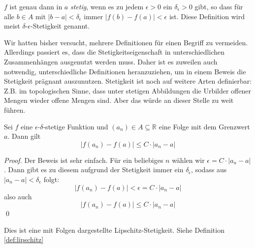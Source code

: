 \begin{definition}
$f$ ist genau dann in $a$ \textsl{stetig}, wenn es zu jedem $\epsilon>0$ ein $\delta_\epsilon > 0$ gibt, so dass für alle $b\in A$ mit $\vert b-a\vert < \delta_\epsilon $ immer $\vert f(b)-f(a)\vert < \epsilon$ ist. Diese Definition wird meist $\delta$-$\epsilon$-Stetigkeit genannt. 
\end{definition}

Wir hatten bisher versucht, mehrere Definitionen für einen Begriff zu vermeiden. Allerdings passiert es, dass die Stetigkeitseigenschaft in unterschiedlichen Zusammenhängen ausgenutzt werden muss. Daher ist es zuweilen auch notwendig, unterschiedliche Definitionen heranzuziehen, um in einem Beweis die Stetigkeit prägnant auszunutzen. Stetigkeit ist noch auf weitere Arten definierbar: Z.B. im topologischen Sinne, dass unter stetigen Abbildungen die Urbilder offener Mengen wieder offene Mengen sind. Aber das würde an dieser Stelle zu weit führen.

\begin{lemma}\label{lem:stetig}
Sei $f$ eine $\epsilon$-$\delta$-stetige Funktion und $(a_n)\in A \subseteq \mathbb{R}$ eine Folge mit dem Grenzwert $a$. Dann gilt
\[
|f(a_n)-f(a)| \le C\cdot |a_n -a|
\]
\end{lemma}
\begin{proof}
Der Beweis ist sehr einfach. Für ein beliebiges $n$ wählen wir $\epsilon = C\cdot |a_n -a|$. Dann gibt es zu diesem aufgrund der Stetigkeit immer ein $\delta_\epsilon$, sodass aus $|a_n-a|<\delta_\epsilon$ folgt:
\[
|f(a_n)-f(a)| < \epsilon = C\cdot |a_n -a|
\]
also auch
\[
|f(a_n)-f(a)| \le C\cdot |a_n -a|
\]
\qed
\end{proof}

\begin{remark}
Dies ist eine mit Folgen dargestellte Lipschitz-Stetigkeit. Siehe Definition \ref{def:lipschitz}
\end{remark}


